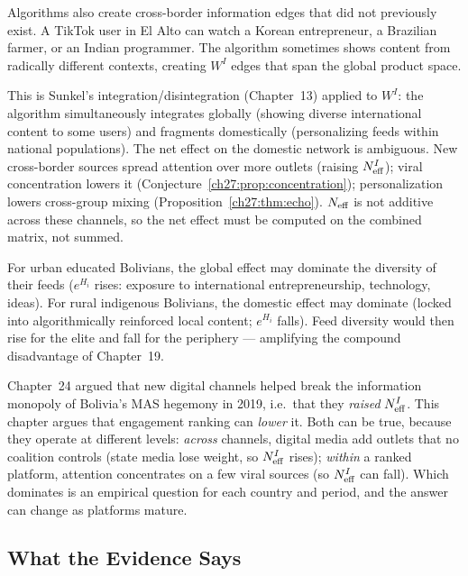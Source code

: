 \documentclass[../structural_economics_book.tex]{subfiles}
\begin{document}
\begin{conjecture}\label{ch27:prop:paradox}
Algorithms also create cross-border information edges that did not previously exist. A TikTok user in El Alto can watch a Korean entrepreneur, a Brazilian farmer, or an Indian programmer. The algorithm sometimes shows content from radically different contexts, creating $W^I$ edges that span the global product space.

This is Sunkel's integration/disintegration (Chapter~13) applied to $W^I$: the algorithm simultaneously integrates globally (showing diverse international content to some users) and fragments domestically (personalizing feeds within national populations). The net effect on the domestic network is ambiguous. New cross-border sources spread attention over more outlets (raising $N_{\text{eff}}^I$); viral concentration lowers it (Conjecture~\ref{ch27:prop:concentration}); personalization lowers cross-group mixing (Proposition~\ref{ch27:thm:echo}). $N_{\text{eff}}$ is not additive across these channels, so the net effect must be computed on the combined matrix, not summed.

For urban educated Bolivians, the global effect may dominate the diversity of their feeds ($e^{H_i}$ rises: exposure to international entrepreneurship, technology, ideas). For rural indigenous Bolivians, the domestic effect may dominate (locked into algorithmically reinforced local content; $e^{H_i}$ falls). Feed diversity would then rise for the elite and fall for the periphery --- amplifying the compound disadvantage of Chapter~19.
\end{conjecture}

\begin{remark}\label{ch27:rem:ch24}
Chapter~24 argued that new digital channels helped break the information monopoly of Bolivia's MAS hegemony in 2019, i.e.\ that they \emph{raised} $N_{\text{eff}}^I$. This chapter argues that engagement ranking can \emph{lower} it. Both can be true, because they operate at different levels: \emph{across} channels, digital media add outlets that no coalition controls (state media lose weight, so $N_{\text{eff}}^I$ rises); \emph{within} a ranked platform, attention concentrates on a few viral sources (so $N_{\text{eff}}^I$ can fall). Which dominates is an empirical question for each country and period, and the answer can change as platforms mature.
\end{remark}

\subsection{What the Evidence Says}
\end{document}
